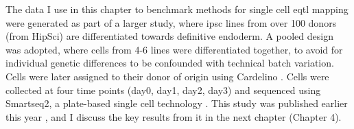 The data I use in this chapter to benchmark methods for single cell \gls{eqtl} mapping 
were generated as part of a larger study, where \gls{ipsc} lines from over 100 donors (from HipSci) are differentiated towards definitive endoderm.
A pooled design was adopted, where cells from 4-6 lines were differentiated together, to avoid for individual genetic differences to be confounded with technical batch variation. 
Cells were later assigned to their donor of origin using Cardelino \cite{mccarthy2020cardelino}. 
Cells were collected at four time points (day0, day1, day2, day3) and sequenced using Smartseq2, a plate-based single cell technology \cite{picelli2013smart}.
This study was published earlier this year \cite{cuomo2020single}, and I discuss the key results from it in the next chapter (Chapter 
4).
\\

